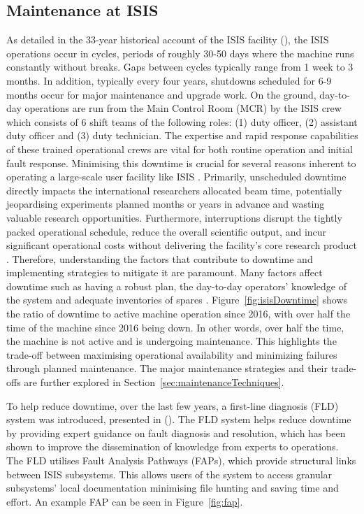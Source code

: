 \documentclass[10pt,oneside]{report}
\begin{document}
\subsection{Maintenance at ISIS} 
As detailed in the 33-year historical account of the ISIS facility (\citet{thomason2019isis}), the ISIS operations occur in cycles, periods of roughly 30-50 days where the machine runs constantly without breaks. Gaps between cycles typically range from 1 week to 3 months. In addition, typically every four years, shutdowns scheduled for 6-9 months occur for major maintenance and upgrade work. On the ground, day-to-day operations are run from the Main Control Room (MCR) by the ISIS crew which consists of 6 shift teams of the following roles: (1) duty officer, (2) assistant duty officer and (3) duty technician.  The expertise and rapid response capabilities of these trained operational crews are vital for both routine operation and initial fault response.
Minimising this downtime is crucial for several reasons inherent to operating a large-scale user facility like ISIS \cite{thomason2019isis}. Primarily, unscheduled downtime directly impacts the international researchers allocated beam time, potentially jeopardising experiments planned months or years in advance and wasting valuable research opportunities. Furthermore, interruptions disrupt the tightly packed operational schedule, reduce the overall scientific output, and incur significant operational costs without delivering the facility's core research product \cite{thomason2019isis}. Therefore, understanding the factors that contribute to downtime and implementing strategies to mitigate it are paramount.
Many factors affect downtime such as having a robust plan, the day-to-day operators' knowledge of the system and adequate inventories of spares \cite{thomason2019isis}. Figure~\ref{fig:isisDowntime} shows the ratio of downtime to active machine operation since 2016, with over half the time of the machine since 2016 being down. In other words, over half the time, the machine is not active and is undergoing maintenance. This highlights the trade-off between maximising operational availability and minimizing failures through planned maintenance. The major maintenance strategies and their trade-offs are further explored in Section~\ref{sec:maintenanceTechniques}.

To help reduce downtime, over the last few years, a first-line diagnosis (FLD) system was introduced, presented in (\citet{fld2017}). The FLD system helps reduce downtime by providing expert guidance on fault diagnosis and resolution, which has been shown to improve the dissemination of knowledge from experts to operations. The FLD utilises Fault Analysis Pathways (FAPs), which provide structural links between ISIS subsystems. This allows users of the system to access granular subsystems' local documentation minimising file hunting and saving time and effort. An example FAP can be seen in Figure~\ref{fig:fap}.
\end{document}
